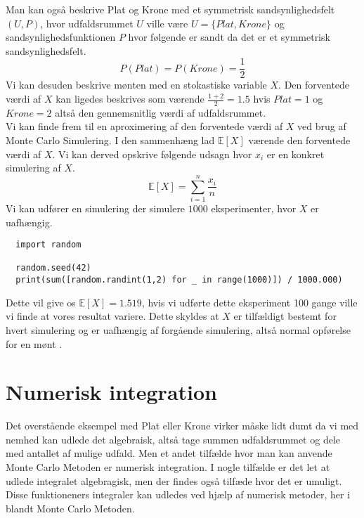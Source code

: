 \documentclass[../../SRP.tex]{subfiles}
\begin{document}
Man kan også beskrive Plat og Krone med et symmetrisk sandsynlighedsfelt $(U, P)$, hvor udfaldsrummet $U$ ville være $U = \{Plat, Krone\}$ og sandsynlighedsfunktionen $P$ hvor følgende er sandt da det er et symmetrisk sandsynlighedsfelt.
\begin{equation}
  P(Plat) = P(Krone) = \frac{1}{2}
\end{equation}
Vi kan desuden beskrive mønten med en stokastiske variable $X$. Den forventede værdi af $X$ kan ligedes beskrives som værende $\frac{1 + 2}{2} = 1.5$ hvis $Plat = 1$ og $Krone = 2$ altså den gennemsnitlig værdi af udfaldsrummet. \\

Vi kan finde frem til en aproximering af den forventede værdi af $X$ ved brug af Monte Carlo Simulering. I den sammenhæng lad $\mathbb{E}[X]$ værende den forventede værdi af $X$. Vi kan derved opskrive følgende udsagn hvor $x_i$ er en konkret simulering af $X$.
\begin{equation}
  \mathbb{E}[X] = \sum\limits_{i=1}^n\frac{x_i}{n}
\end{equation}
Vi kan udfører en simulering der simulere $1000$ eksperimenter, hvor $X$ er uafhængig.
\begin{lstlisting}
  import random

  random.seed(42)
  print(sum([random.randint(1,2) for _ in range(1000)]) / 1000.000)
\end{lstlisting}
Dette vil give os $\mathbb{E}[X] = 1.519$, hvis vi udførte dette eksperiment 100 gange ville vi finde at vores resultat variere. Dette skyldes at $X$ er tilfældigt bestemt for hvert simulering og er uafhængig af forgående simulering, altså normal opførelse for en mønt \cite{NM}. \\

\section{Numerisk integration}

Det overstående eksempel med Plat eller Krone virker måske lidt dumt da vi med nemhed kan udlede det algebraisk, altså tage summen udfaldsrummet og dele med antallet af mulige udfald. Men et andet tilfælde hvor man kan anvende Monte Carlo Metoden er numerisk integration. I nogle tilfælde er det let at udlede integralet algebragisk, men der findes også tilfæde hvor det er umuligt. Disse funktioneners integraler kan udledes ved hjælp af numerisk metoder, her i blandt Monte Carlo Metoden. \\
\end{document}
